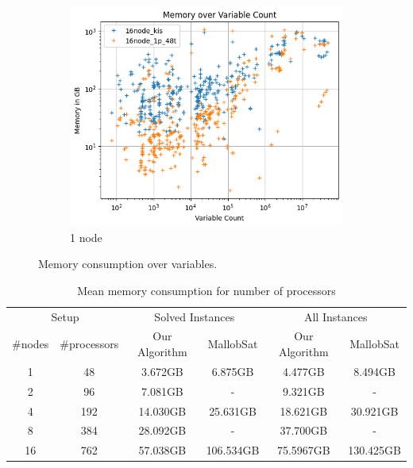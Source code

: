 \documentclass[12pt,a4paper,twoside]{scrartcl}
\numberwithin{equation}{section}
\begin{document}
\begin{figure}
\begin{subfigure}[c]{.4\textwidth}
    \center
    \includegraphics[scale=.3]{plots/16node_compare/mem_abs_over_vars.png}
    \caption{1 node}
  \end{subfigure}
  \caption{Memory consumption over variables.}
  \label{fig:memAbsVars}
\end{figure}

\begin{table}
  \center
  \begin{tabular}{ cccccc }
    \toprule
    \multicolumn{2}{c}{Setup} & \multicolumn{2}{c}{Solved Instances} & \multicolumn{2}{c}{All Instances}\\
    \#nodes & \#processors & Our Algorithm & MallobSat & Our Algorithm & MallobSat \\
    \midrule
    1  & 48  & 3.672GB & 6.875GB & 4.477GB & 8.494GB\\
    2  & 96  & 7.081GB & - & 9.321GB & -\\
    4  & 192 & 14.030GB & 25.631GB & 18.621GB & 30.921GB\\
    8  & 384 & 28.092GB & - & 37.700GB & -\\
    16 & 762 & 57.038GB & 106.534GB & 75.5967GB & 130.425GB\\
    \bottomrule
  \end{tabular}
  \caption{Mean memory consumption for number of processors}
  \label{tab:memMean}
\end{table}
\end{document}

